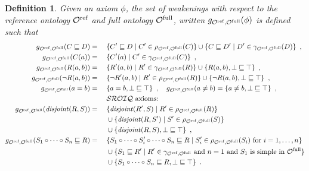 \documentclass[
]{ceurart}
\newtheorem{definition}{Definition}
\newtheorem{example}{Example}
\begin{document}
\begin{definition}
  Given an axiom $\phi$, the set of \emph{weakenings} with respect to the reference ontology ${\mathcal{O}^\textnormal{ref}}$ and full ontology ${\mathcal{O}^\textnormal{full}}$, written $g_{{\mathcal{O}^\textnormal{ref}},{\mathcal{O}^\textnormal{full}}}(\phi)$ is defined such that
  \begin{alignat*}{2}
    g_{\Omcref,\Omcfull}(C \sqsubseteq D) &={} &&\{ C' \sqsubseteq D \mid C' \in \rho_{\Omcref,\Omcfull} (C) \} \cup \{ C \sqsubseteq D' \mid D' \in \gamma_{\Omcref,\Omcfull}(D) \} \enspace, \\
    g_{\Omcref,\Omcfull}(C(a)) &={} && \{ C'(a) \mid C' \in \gamma_{\Omcref,\Omcfull}(C) \} \enspace, \\
    g_{\Omcref,\Omcfull}(R(a, b)) &={} && \{ R'(a, b) \mid R' \in \gamma_{\Omcref,\Omcfull}(R) \} \cup \{ R(a, b), \bot \sqsubseteq \top \} \enspace, \\
    g_{\Omcref,\Omcfull}(\lnot R(a, b)) &={} && \{ \lnot R'(a, b) \mid R' \in \rho_{\Omcref,\Omcfull}(R) \} \cup \{ \lnot R(a, b), \bot \sqsubseteq \top \} \enspace, \\
    g_{\Omcref,\Omcfull}(a = b) &={} && \{ a = b, \bot \sqsubseteq \top \} \enspace,
    \quad g_{\Omcref,\Omcfull}(a \not= b) = \{ a \not= b, \bot \sqsubseteq \top \} \enspace, \\
    &&& \text{\SROIQ axioms:} \\
    g_{\Omcref,\Omcfull}(\disjoint(R, S)) &={} &&\{ \disjoint(R', S) \mid R' \in \rho_{\Omcref,\Omcfull} (R) \} \\
    &&& \cup \{ \disjoint(R, S') \mid S' \in \rho_{\Omcref,\Omcfull}(S) \} \\
    &&& \cup \{ \disjoint (R, S), \bot \sqsubseteq \top \} \enspace, \\
    g_{\Omcref,\Omcfull}(S_1 \circ \cdots \circ S_n \sqsubseteq R) &={} && \{ S_1 \circ \cdots \circ S_i' \circ \cdots \circ S_n \sqsubseteq R \mid S_i' \in \rho_{\Omcref,\Omcfull}(S_i) \text{ for } i = 1, \dots, n \} \\
    &&& \cup \{ S_1 \sqsubseteq R' \mid R' \in \gamma_{\Omcref,\Omcfull} \text{ and } n = 1 \text{ and } S_1 \text{ is simple in } \Omcfull \} \\
    &&& \cup \{ S_1 \circ \cdots \circ S_n \sqsubseteq R, \bot \sqsubseteq \top \} \enspace.
  \end{alignat*}
\end{definition}

\end{document}
